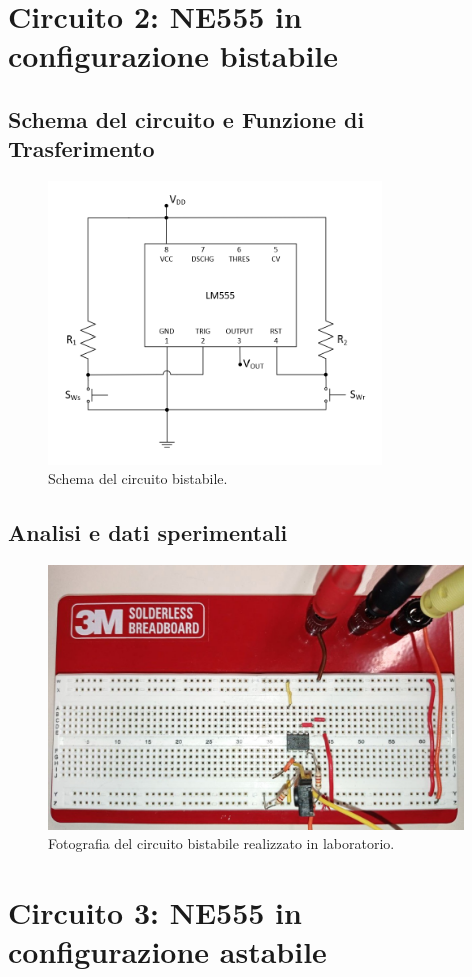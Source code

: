 \documentclass{report}
\begin{document}
\section{Circuito 2: NE555 in configurazione bistabile}\label{sez2}
\subsection{Schema del circuito e Funzione di Trasferimento}
\begin{figure}[h!]
	\centering
	\includegraphics[height=7.5cm]{immagini/schema2}
	\caption{Schema del circuito bistabile.}
	\label{figura:schema2}
\end{figure}
\subsection{Analisi e dati sperimentali}
\begin{figure}[h!]
	\centering
	\includegraphics[height=7cm]{immagini/circuito2}
	\caption{Fotografia del circuito bistabile realizzato in laboratorio.}
	\label{figura:circuito2}
\end{figure}
\newpage
\section{Circuito 3: NE555 in configurazione astabile}
\end{document}
